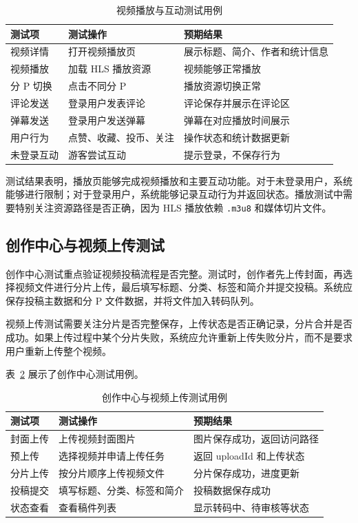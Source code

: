 \begin{table}[htbp]
  \centering
  \caption{视频播放与互动测试用例}
  \label{tab:play-interact-test}
  \begin{tabular}{p{}p{}p{}}
    \hline
    \textbf{测试项} & \textbf{测试操作} & \textbf{预期结果} \\
    \hline
    视频详情 & 打开视频播放页 & 展示标题、简介、作者和统计信息 \\
    视频播放 & 加载 HLS 播放资源 & 视频能够正常播放 \\
    分 P 切换 & 点击不同分 P & 播放资源切换正常 \\
    评论发送 & 登录用户发表评论 & 评论保存并展示在评论区 \\
    弹幕发送 & 登录用户发送弹幕 & 弹幕在对应播放时间展示 \\
    用户行为 & 点赞、收藏、投币、关注 & 操作状态和统计数据更新 \\
    未登录互动 & 游客尝试互动 & 提示登录，不保存行为 \\
    \hline
  \end{tabular}
\end{table}

测试结果表明，播放页能够完成视频播放和主要互动功能。对于未登录用户，系统能够进行限制；对于登录用户，系统能够记录互动行为并返回状态。播放测试中需要特别关注资源路径是否正确，因为 HLS 播放依赖 \texttt{.m3u8} 和媒体切片文件。

\subsection{创作中心与视频上传测试}
\label{subsec:creator-upload-test}

创作中心测试重点验证视频投稿流程是否完整。测试时，创作者先上传封面，再选择视频文件进行分片上传，最后填写标题、分类、标签和简介并提交投稿。系统应保存投稿主数据和分 P 文件数据，并将文件加入转码队列。

视频上传测试需要关注分片是否完整保存，上传状态是否正确记录，分片合并是否成功。如果上传过程中某个分片失败，系统应允许重新上传失败分片，而不是要求用户重新上传整个视频。

表~\ref{tab:creator-upload-test} 展示了创作中心测试用例。

\begin{table}[htbp]
  \centering
  \caption{创作中心与视频上传测试用例}
  \label{tab:creator-upload-test}
  \begin{tabular}{p{}p{}p{}}
    \hline
    \textbf{测试项} & \textbf{测试操作} & \textbf{预期结果} \\
    \hline
    封面上传 & 上传视频封面图片 & 图片保存成功，返回访问路径 \\
    预上传 & 选择视频并申请上传任务 & 返回 uploadId 和上传状态 \\
    分片上传 & 按分片顺序上传视频文件 & 分片保存成功，进度更新 \\
    投稿提交 & 填写标题、分类、标签和简介 & 投稿数据保存成功 \\
    状态查看 & 查看稿件列表 & 显示转码中、待审核等状态 \\
    \hline
  \end{tabular}
\end{table}

